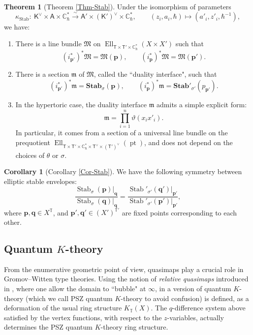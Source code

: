 \documentclass[10pt]{amsart}
\theoremstyle{definition}
\def\CC{{\mathbb{C}}}
\def\TT{\mathbb{T}}
\newcommand{\bp}{\mathbf{p}}
\newcommand{\bq}{\mathbf{q}}
\newcommand{\bStab}{\mathbf{Stab}}
\newcommand{\Ell}{\operatorname{Ell}}
\newcommand{\pt}{\operatorname{pt}}
\newcommand{\Stab}{\operatorname{Stab}}
\newcommand{\bA}{\mathsf{A}}
\newcommand{\bT}{\mathsf{T}}
\newcommand{\bK}{\mathsf{K}}
\theoremstyle{definition}
\numberwithin{equation}{section}
\theoremstyle{Theorem}
\newtheorem{Theorem}[Definition]{Theorem}
\newtheorem{Corollary}[Definition]{Corollary}
\begin{document}
\begin{Theorem} [Theorem \ref{Thm-Stab}]
	
	Under the isomorphism of parameters
	$$
	\kappa_{\Stab} :  \ \bK^\vee \times \bA \times \CC^*_\hbar \xrightarrow{\sim} \bA' \times (\bK')^\vee \times \CC^*_\hbar, \qquad ( z_i , a_i, \hbar) \mapsto ( a'_i, z'_i,  \hbar^{-1}),
	$$
	we have:
	\begin{enumerate}[1)]
		
		\item There is a line bundle $\mathfrak{M}$ on $\Ell_{\bT \times \bT' \times \CC_\hbar^*} (X \times X')$ such that
		$$
		(i_{\bp'}^*)^* \mathfrak{M} = \mathfrak{M} (\bp) , \qquad (i_\bp^*)^* \mathfrak{M} = \mathfrak{M} (\bp').
		$$
		
		\item There is a section $\mathfrak{m}$ of $\mathfrak{M}$, called the ``duality interface", such that
		$$
		(i_{\bp'}^*)^* \mathfrak{m} = \bStab_{\sigma} (\bp) , \qquad (i_\bp^*)^* \mathfrak{m} = \bStab'_{\sigma'} (p_{\bp'}) .
		$$
		
		\item In the hypertoric case, the duality interface $\mathfrak{m}$ admits a simple explicit form:
		$$
		\mathfrak{m} = \prod_{i=1}^n \vartheta (x_i x'_i)  .
		$$
		In particular, it comes from a section of a universal line bundle on the prequotient $\Ell_{\bT \times \bT' \times \CC_\hbar^* \times \bT^\vee \times (\bT')^\vee} (\pt)$, and does not depend on the choices of $\theta$ or $\sigma$.
	\end{enumerate}
\end{Theorem}

\begin{Corollary} [Corollary \ref{Cor-Stab}]
	We have the following symmetry between elliptic stable envelopes:
	$$
	\frac{\Stab_\sigma (\bp) |_\bq }{\Stab_\sigma (\bq) |_\bq } = \frac{\Stab'_{\sigma'} (\bq') |_{\bp'}}{\Stab'_{\sigma'} (\bp') |_{\bp'}},
	$$
	where $\bp, \bq \in X^\TT$, and $\bp', \bq' \in (X')^{\TT'}$ are fixed points corresponding to each other.
\end{Corollary}



\subsection{Quantum $K$-theory}

From the enumerative geometric point of view, quasimaps play a crucial role in Gromov--Witten type theories. Using the notion of \emph{relative quasimaps} introduced in \cite{Oko}, where one allow the domain to ``bubble" at $\infty$, in \cite{PSZ, KPSZ} a version of quantum $K$-theory (which we call PSZ quantum $K$-theory to avoid confusion) is defined, as a deformation of the usual ring structure $K_\TT(X)$. The $q$-difference system above satisfied by the vertex functions, with respect to the $z$-variables, actually determines the PSZ quantum $K$-theory ring structure.
\end{document}
